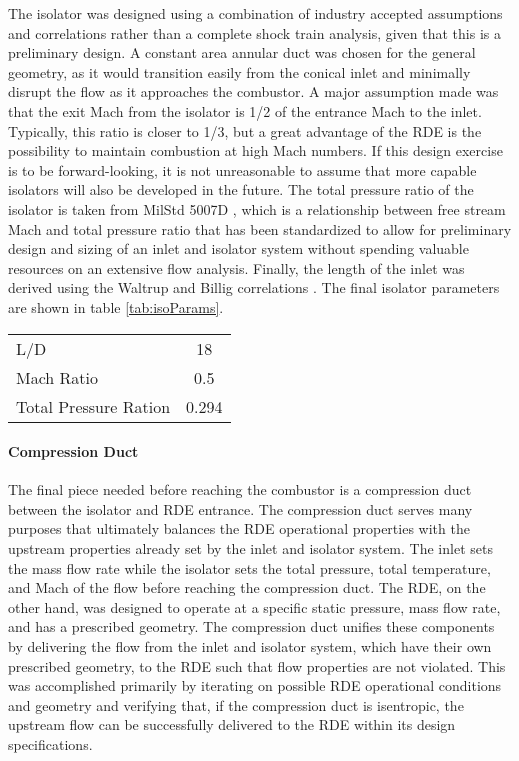     The isolator was designed using a combination of industry accepted assumptions and correlations rather than a complete shock train analysis, given that this is a preliminary design. A constant area annular duct was chosen for the general geometry, as it would transition easily from the conical inlet and minimally disrupt the flow as it approaches the combustor. 
A major assumption made was that the exit Mach from the isolator is 1/2 of the entrance Mach to the inlet. Typically, this ratio is closer to 1/3, but a great advantage of the RDE is the possibility to maintain combustion at high Mach numbers. If this design exercise is to be forward-looking, it is not unreasonable to assume that more capable isolators will also be developed in the future. 
    The total pressure ratio of the isolator is taken from MilStd 5007D \cite{milstd5007D}, which is a relationship between free stream Mach and total pressure ratio that has been standardized to allow for preliminary design and sizing of an inlet and isolator system without spending valuable resources on an extensive flow analysis. Finally, the length of the inlet was derived using the Waltrup and Billig correlations \cite{waltrup}. The final isolator parameters are shown in table \ref{tab:isoParams}.

\begin{center}
\begin{tabular}{l c}
L/D  & 18 \\
Mach Ratio & 0.5 \\
Total Pressure Ration & 0.294
\label{tab:isoParams}
\end{tabular}
\end{center}

\paragraph{Compression Duct}

    The final piece needed before reaching the combustor is a compression duct between the isolator and RDE entrance. The compression duct serves many purposes that ultimately balances the RDE operational properties with the upstream properties already set by the inlet and isolator system. The inlet sets the mass flow rate while the isolator sets the total pressure, total temperature, and Mach of the flow before reaching the compression duct. The RDE, on the other hand, was designed to operate at a specific static pressure, mass flow rate, and has a prescribed geometry. The compression duct unifies these components by delivering the flow from the inlet and isolator system, which have their own prescribed geometry, to the RDE such that flow properties are not violated. This was accomplished primarily by iterating on possible RDE operational conditions and geometry and verifying that, if the compression duct is isentropic, the upstream flow can be successfully delivered to the RDE within its design specifications. 
